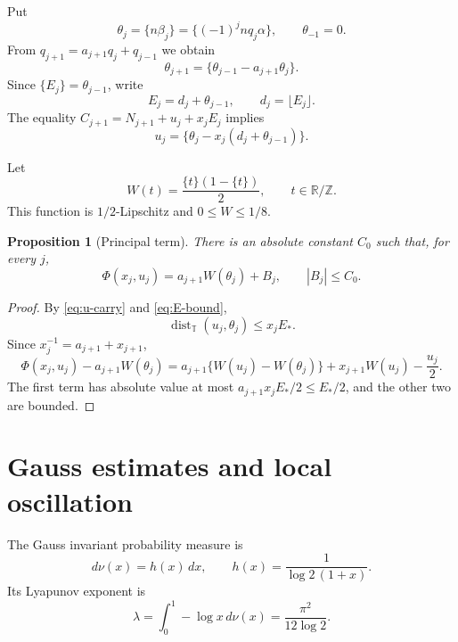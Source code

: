 \documentclass[11pt,a4paper]{amsart}
\newtheorem{proposition}[theorem]{Proposition}
\theoremstyle{definition}
\theoremstyle{remark}
\newcommand{\T}{\mathbb T}
\newcommand{\Z}{\mathbb Z}
\newcommand{\R}{\mathbb R}
\newcommand{\dist}{\operatorname{dist}}
\begin{document}
Put
\begin{equation}\label{eq:theta}
 \theta_j=\{n\beta_j\}=\{(-1)^jnq_j\alpha\},
 \qquad \theta_{-1}=0.
\end{equation}
From $q_{j+1}=a_{j+1}q_j+q_{j-1}$ we obtain
\begin{equation}\label{eq:theta-cocycle}
 \theta_{j+1}=\{\theta_{j-1}-a_{j+1}\theta_j\}.
\end{equation}
Since $\{E_j\}=\theta_{j-1}$, write
\[
 E_j=d_j+\theta_{j-1},\qquad d_j=\lfloor E_j\rfloor.
\]
The equality $C_{j+1}=N_{j+1}+u_j+x_jE_j$ implies
\begin{equation}\label{eq:u-carry}
 u_j=\{\theta_j-x_j(d_j+\theta_{j-1})\}.
\end{equation}

Let
\[
 W(t)=\frac{\{t\}(1-\{t\})}{2},\qquad t\in\R/\Z.
\]
This function is $1/2$-Lipschitz and $0\le W\le1/8$.

\begin{proposition}[Principal term]\label{prop:principal}
There is an absolute constant $C_0$ such that, for every $j$,
\begin{equation}\label{eq:principal-split}
 \Phi(x_j,u_j)=a_{j+1}W(\theta_j)+B_j,
 \qquad |B_j|\le C_0.
\end{equation}
\end{proposition}

\begin{proof}
By \eqref{eq:u-carry} and \eqref{eq:E-bound},
\[
 \dist_{\T}(u_j,\theta_j)\le x_jE_*.
\]
Since $x_j^{-1}=a_{j+1}+x_{j+1}$,
\[
 \Phi(x_j,u_j)-a_{j+1}W(\theta_j)
 =a_{j+1}\{W(u_j)-W(\theta_j)\}
  +x_{j+1}W(u_j)-\frac{u_j}{2}.
\]
The first term has absolute value at most
$a_{j+1}x_jE_*/2\le E_*/2$, and the other two are bounded.
\end{proof}


\section{Gauss estimates and local oscillation}

The Gauss invariant probability measure is
\begin{equation}\label{eq:gauss-measure}
 d\nu(x)=h(x)\,dx,
 \qquad h(x)=\frac1{\log2\,(1+x)}.
\end{equation}
Its Lyapunov exponent is
\begin{equation}\label{eq:lambda}
 \lambda=\int_0^1-\log x\,d\nu(x)
 =\frac{\pi^2}{12\log2}.
\end{equation}
\end{document}
